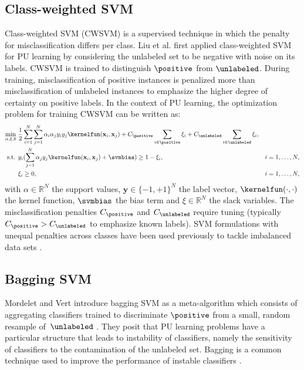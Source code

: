 \subsection{Class-weighted SVM} \label{bsvm}
Class-weighted SVM (CWSVM) is a supervised technique in which the penalty for misclassification differs per class. Liu et al. \citep{Liu:2003:BTC:951949.952139} first applied class-weighted SVM for PU learning by considering the unlabeled set to be negative with noise on its labels. CWSVM is trained to distinguish $\positive$ from $\unlabeled$. During training, misclassification of positive instances is penalized more than misclassification of unlabeled instances to emphasize the higher degree of certainty on positive labels. In the context of PU learning, the optimization problem for training CWSVM can be written as:
\begin{align}
\min_{\alpha,\xi,b}\ & \frac{1}{2}\sum_{i=1}^N\sum_{j=1}^N \alpha_i\alpha_j y_i y_j \kernelfun(\mathbf{x}_i,\mathbf{x}_j)+C_{\positive}\sum_{i \in\positive} \xi_i + C_{\unlabeled}\sum_{i\in\unlabeled} \xi_i, \label{eq:bsvm} \\
\text{s.t. } &y_i(\sum_{j=1}^N \alpha_j y_j \kernelfun(\mathbf{x}_i,\mathbf{x}_j)+\svmbias)\geq 1-\xi_i, &i=1,\ldots,N, \nonumber \\
&\xi_i \geq 0, &i=1,\ldots,N, \nonumber
\end{align}
with $\alpha \in \mathbb{R}^N$ the support values, $\mathbf{y} \in \{-1,+1\}^N$ the label vector, $\kernelfun(\cdot,\cdot)$ the kernel function, $\svmbias$ the bias term and $\xi \in \mathbb{R}^N$ the slack variables. The misclassification penalties $C_{\positive}$ and $C_{\unlabeled}$ require tuning (typically $C_{\positive} > C_{\unlabeled}$ to emphasize known labels). SVM formulations with unequal penalties across classes have been used previously to tackle imbalanced data sets \citep{osuna1997}. 

\subsection{Bagging SVM} \label{baggingsvm}
Mordelet and Vert introduce bagging SVM as a meta-algorithm which consists of aggregating classifiers trained to discriminate $\positive$ from a small, random resample of\ $\unlabeled$ \citep{MORDELET-2010-523336}. They posit that PU learning problems have a particular structure that leads to instability of classifiers, namely the sensitivity of classifiers to the contamination of the unlabeled set.  Bagging is a common technique used to improve the performance of instable classifiers \citep{Breiman:1996:BP:231986.231989}.

